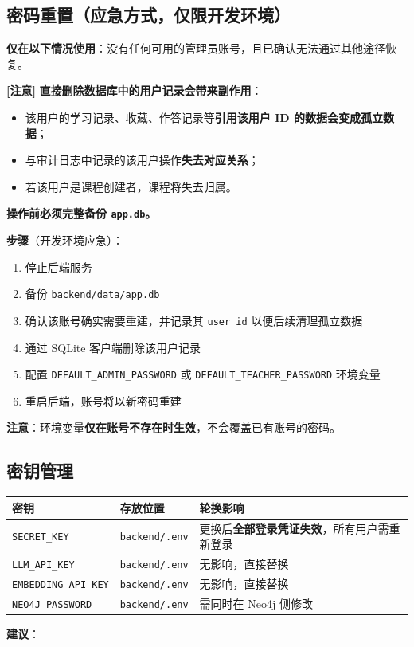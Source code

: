 \documentclass[UTF8,a4paper,11pt]{ctexrep}
\newcommand{\warnmark}{\textcolor{todobar}{\textbf{[注意]}}}
\begin{document}
\subsection{密码重置（应急方式，仅限开发环境）}

\textbf{仅在以下情况使用}：没有任何可用的管理员账号，且已确认无法通过其他途径恢复。

\begin{todobox}
\warnmark{} \textbf{直接删除数据库中的用户记录会带来副作用}：

\begin{itemize}
\item 该用户的学习记录、收藏、作答记录等\textbf{引用该用户 ID 的数据会变成孤立数据}；
\item 与审计日志中记录的该用户操作\textbf{失去对应关系}；
\item 若该用户是课程创建者，课程将失去归属。
\end{itemize}
\textbf{操作前必须完整备份 \texttt{app.db}。}

\end{todobox}

\textbf{步骤}（开发环境应急）：

\begin{enumerate}
\item 停止后端服务
\item 备份 \texttt{backend/data/app.db}
\item 确认该账号确实需要重建，并记录其 \texttt{user\_id} 以便后续清理孤立数据
\item 通过 SQLite 客户端删除该用户记录
\item 配置 \texttt{DEFAULT\_ADMIN\_PASSWORD} 或 \texttt{DEFAULT\_TEACHER\_PASSWORD} 环境变量
\item 重启后端，账号将以新密码重建
\end{enumerate}
\begin{notebox}
\textbf{注意}：环境变量\textbf{仅在账号不存在时生效}，不会覆盖已有账号的密码。

\end{notebox}


\subsection{密钥管理}

\begin{center}
\small
\begin{tabularx}{\linewidth}{@{}XXX@{}}
\toprule
密钥 & 存放位置 & 轮换影响 \\
\midrule
\texttt{SECRET\_KEY} & \texttt{backend/.env} & 更换后\textbf{全部登录凭证失效}，所有用户需重新登录 \\
\texttt{LLM\_API\_KEY} & \texttt{backend/.env} & 无影响，直接替换 \\
\texttt{EMBEDDING\_API\_KEY} & \texttt{backend/.env} & 无影响，直接替换 \\
\texttt{NEO4J\_PASSWORD} & \texttt{backend/.env} & 需同时在 Neo4j 侧修改 \\
\bottomrule
\end{tabularx}
\end{center}
\textbf{建议}：
\end{document}
